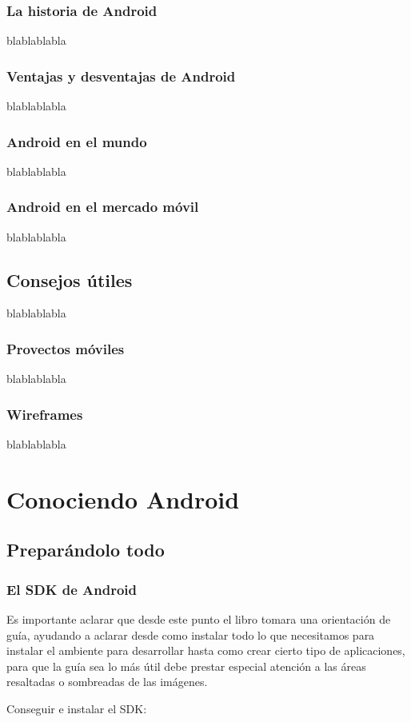 \documentclass[11pt]{book}
\begin{document}
\section{La historia de Android}
blablablabla
\section{Ventajas y desventajas de Android}
blablablabla
\section{Android en el mundo}                 
blablablabla
\section{Android en el mercado móvil} 
blablablabla

\chapter{Consejos útiles}  
blablablabla
\section{Provectos móviles}
blablablabla
\section{Wireframes}                 
blablablabla


\part{Conociendo Android}    
            
\chapter{Preparándolo todo}              
\newpage
\section{El SDK de Android}
Es importante aclarar que desde este punto el libro tomara una orientación de guía, ayudando a aclarar desde como instalar todo lo que necesitamos para instalar el ambiente para desarrollar hasta como crear cierto tipo de aplicaciones, para que la guía sea lo más útil debe prestar especial atención a las áreas resaltadas o sombreadas de las imágenes. 

Conseguir e instalar el SDK:
\end{document}
